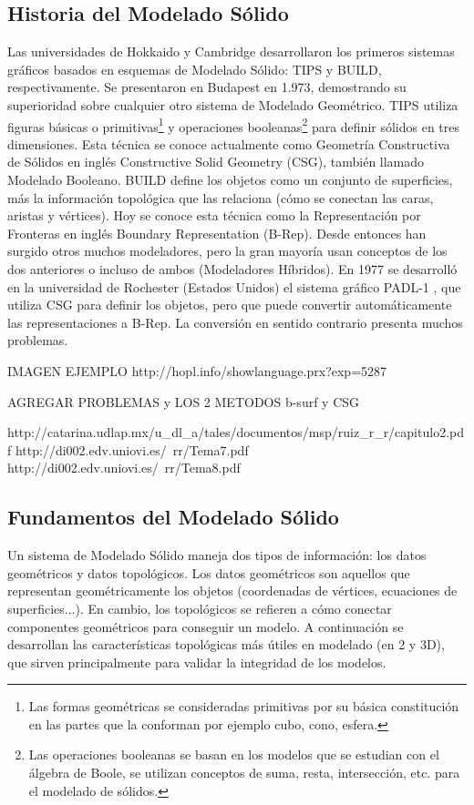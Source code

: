 \subsection{ Historia del Modelado Sólido }
Las universidades de Hokkaido y Cambridge desarrollaron los primeros sistemas
gráficos basados en esquemas de Modelado Sólido: TIPS y BUILD\cite{Toriya:1993:CPA:562297},
respectivamente. Se presentaron en Budapest en 1.973, demostrando su superioridad
sobre cualquier otro sistema de Modelado Geométrico.
TIPS utiliza figuras básicas o primitivas\footnote{ Las formas geométricas se consideradas primitivas por su básica constitución en las partes que la conforman por ejemplo cubo, cono, esfera.} y operaciones booleanas\footnote{Las operaciones booleanas se basan en los modelos que se estudian con el álgebra de Boole, se utilizan conceptos de suma, resta, intersección, etc. para el modelado de sólidos.} para definir sólidos en tres dimensiones. Esta técnica se conoce actualmente como Geometría Constructiva de Sólidos en inglés Constructive Solid Geometry (CSG), también llamado Modelado Booleano.
BUILD define los objetos como un conjunto de superficies, más la información
topológica que las relaciona (cómo se conectan las caras, aristas y vértices). Hoy se conoce esta técnica como la Representación por Fronteras en inglés Boundary Representation (B-Rep).
Desde entonces han surgido otros muchos modeladores, pero la gran
mayoría usan conceptos de los dos anteriores o incluso de ambos (Modeladores
Híbridos).
En 1977 se desarrolló en la universidad de Rochester (Estados Unidos)
el sistema gráfico PADL-1 \cite{Toriya:1993:CPA:562297}, que utiliza CSG para definir los objetos, pero que
puede convertir automáticamente las representaciones a B-Rep. La conversión
en sentido contrario presenta muchos problemas. 

IMAGEN EJEMPLO http://hopl.info/showlanguage.prx?exp=5287 

AGREGAR PROBLEMAS y LOS 2 METODOS b-surf y CSG

http://catarina.udlap.mx/u_dl_a/tales/documentos/msp/ruiz_r_r/capitulo2.pdf
http://di002.edv.uniovi.es/~rr/Tema7.pdf
http://di002.edv.uniovi.es/~rr/Tema8.pdf

\subsection{ Fundamentos del Modelado Sólido }
Un sistema de Modelado Sólido maneja dos tipos de información: los datos geométricos y datos topológicos. Los datos geométricos son aquellos que representan geométricamente los objetos (coordenadas de vértices, ecuaciones de superficies...). En cambio, los topológicos se refieren a cómo conectar componentes geométricos para conseguir un modelo.
A continuación se desarrollan las características topológicas más útiles en modelado (en 2 y 3D), que sirven principalmente para validar la integridad de los modelos.

